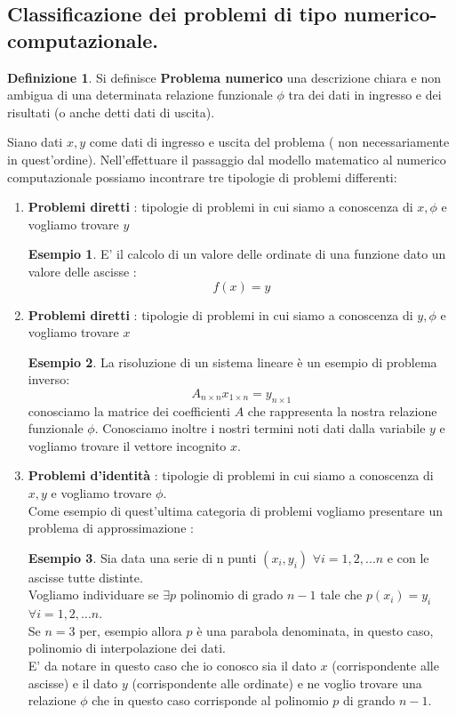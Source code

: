 \documentclass[12pt, a4paper]{book}
\theoremstyle{definition}
\newtheorem{exmp}{Esempio}[section]
\newtheorem{defn}{Definizione}[section]
\begin{document}
\subsection{Classificazione dei problemi di tipo numerico-computazionale.}
\begin{flushleft}

\begin{defn}
Si definisce \textbf{Problema numerico} una descrizione chiara e non ambigua di una determinata relazione funzionale $\phi$ tra dei dati in ingresso e dei risultati (o anche detti dati di uscita). 
\end{defn}
\vspace{1cm}

Siano dati $x,y$ come dati di ingresso e uscita del problema ( non necessariamente in quest'ordine).
Nell'effettuare il passaggio dal modello matematico al numerico computazionale possiamo incontrare tre tipologie di problemi differenti: 

\begin{enumerate}
\item \textbf{Problemi diretti} : tipologie di problemi in cui siamo a conoscenza di $x, \phi$ e vogliamo trovare $y$
\begin{exmp}
E' il calcolo di un valore delle ordinate di una funzione dato un valore delle ascisse :
\[f(x) = y\]
\end{exmp}
\item \textbf{Problemi diretti} : tipologie di problemi in cui siamo a conoscenza di $y, \phi$ e vogliamo trovare $x$
\begin{exmp}
La risoluzione di un sistema lineare è un esempio di problema inverso: 
\[ A_{n \times n} x_{1 \times n} = y_{n \times 1}\]
conosciamo la matrice dei coefficienti $A$ che rappresenta la nostra relazione funzionale $\phi$.  Conosciamo inoltre i nostri termini noti dati dalla variabile $y$ e vogliamo trovare il vettore incognito $x$.
\end{exmp}
\item \textbf{Problemi d'identità} : tipologie di problemi in cui siamo a conoscenza di $x, y$ e vogliamo trovare $\phi$.\\
Come esempio di quest'ultima categoria di problemi vogliamo presentare un problema di approssimazione :
\begin{exmp}
Sia data una serie di n punti $(x_{i}, y_{i})$ $\forall i = 1,2, ...  n$ e con le ascisse tutte distinte. \\
Vogliamo individuare se $\exists p $ polinomio di grado $n-1$ tale che $p(x_{i}) = y_{i}$ $\forall i = 1,2, ...  n$.\\
Se $n = 3$ per,  esempio allora $p$ è una parabola denominata,  in questo caso,  polinomio di interpolazione dei dati. \\
E' da notare in questo caso che io conosco sia il dato $x$ (corrispondente alle ascisse) e il dato $y$ (corrispondente alle ordinate) e ne voglio trovare una relazione $\phi$ che in questo caso corrisponde al polinomio $p$ di grando $n-1$.
\end{exmp}
\end{enumerate}
\end{flushleft}
\end{document}
